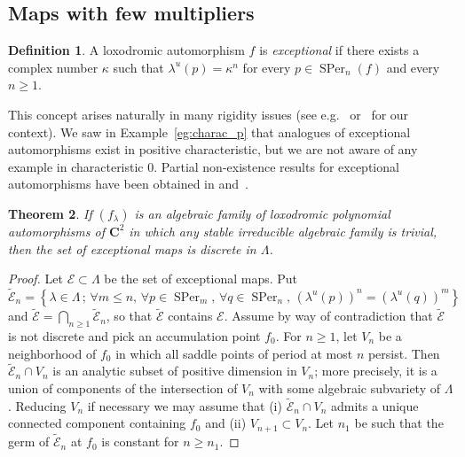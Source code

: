 \documentclass[oneside, 12pt]{amsart}
\newcommand{\set}[1]{\left\{#1\right\}}
\DeclareMathOperator{\SPer}{SPer}
\newcommand{\C}{\mathbf{C}}
\theoremstyle{plain}
\newtheorem{thm}{Theorem}[section]
\theoremstyle{definition}
\newtheorem{defi}[thm]{Definition}
\numberwithin{equation}{section}       %
\numberwithin{equation}{section}       %
\begin{document}
\begin{vlongue}
\appendix 

\section{Maps with few multipliers} 

\begin{defi} A loxodromic automorphism $f$  is \emph{exceptional}  if there exists 
a complex number $\kappa$ such that  $\lambda^u(p) = \kappa^{n}$
 for every  $p\in \SPer_n(f)$ and every $n\geq 1$. 
\end{defi}


This concept arises naturally in many rigidity issues 
(see e.g.~\cite{BK1} or~\cite[\S 2]{rigidity} for our context). 
We saw in Example~\ref{eg:charac_p} that analogues of 
exceptional automorphisms exist in positive characteristic, but 
we are not aware of any example in characteristic $0$. Partial non-existence results for exceptional 
automorphisms have been  obtained in \cite[Prop. 6.1]{BK1} and~\cite[Prop. 8.9]{rigidity}.



\begin{thm}
If $(f_\lambda)$ is an algebraic family of loxodromic polynomial automorphisms of $\C^2$ in which any stable irreducible algebraic family is trivial, then the set of exceptional maps is discrete in $\Lambda$. 
\end{thm}

\begin{proof}
Let $\mathcal E\subset \Lambda$ be the set of exceptional maps. Put 
$$\widetilde {\mathcal E}_n = \set{\lambda\in \Lambda\, ; \,  \forall m\leq n, \, \forall p\in  \SPer_m, \, 
\forall q\in  \SPer_n, \, (\lambda^u(p))^n = (\lambda^u(q))^m} $$
and $\widetilde {\mathcal E}= \bigcap_{n\geq 1}\widetilde {\mathcal E}_n$,  
so that $\widetilde {\mathcal E}$ contains $\mathcal E$. Assume by way of contradiction that 
$\widetilde {\mathcal E}$ is not discrete and pick an accumulation point 
$f_0$. For  $n\geq 1$, let $V_n$ be a neighborhood of $f_0$ in which all saddle points of period at most $n$ persist.  
Then $\widetilde {\mathcal E}_n\cap V_n$ is an analytic subset of positive dimension
 in $V_n$; more precisely, it is a 
  union of components of the intersection of $V_n$ with some algebraic subvariety of $\Lambda$.  Reducing $V_n$ if necessary we may assume that (i) $\widetilde {\mathcal E}_n\cap V_n$ admits a unique connected component containing $f_0$ and (ii)  $V_{n+1}\subset V_n$. Let $n_1$ be such that the germ of 
   $\widetilde {\mathcal E}_n$ at $f_0$ is constant for $n\geq n_1$. 
   

\end{proof}
\end{vlongue}
\end{document}
